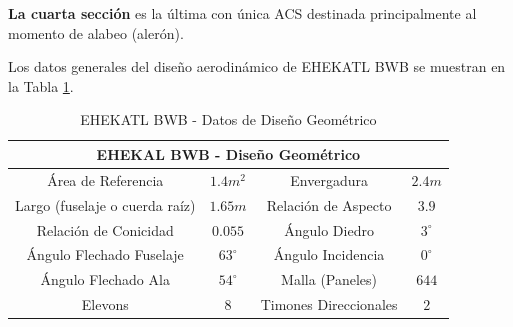 \textbf{La cuarta sección} es la última con única ACS destinada principalmente al momento de alabeo (alerón). 

Los datos generales del diseño aerodinámico de EHEKATL BWB se muestran en la Tabla \ref{EHEKATL BWB G-33 ficha geometrica}.

\begin{table}[!h]
    \caption{EHEKATL BWB - Datos de Diseño Geométrico}
    \centering
    \begin{tabular}{|c|c|c|c|}
    \hline
    \multicolumn{4}{|c|}{EHEKAL BWB - Diseño Geométrico}\\
    \hline
    Área de Referencia &  $1.4 m^2$ & Envergadura & $2.4m$  \\
    Largo (fuselaje o cuerda raíz) & $1.65m$ & Relación de Aspecto & $3.9$ \\
    Relación de Conicidad & $0.055$ & Ángulo Diedro & $3^\circ$ \\
    Ángulo Flechado Fuselaje & $63^\circ$ & Ángulo Incidencia & $0^\circ$ \\
    Ángulo Flechado Ala & $54^\circ$ & Malla (Paneles) & $644$ \\
    Elevons & $8$ & Timones Direccionales & $2$ \\
    \hline
    \end{tabular}
    \label{EHEKATL BWB G-33 ficha geometrica}
\end{table}

